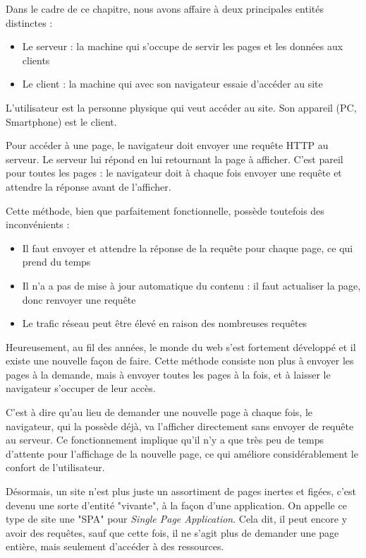 \documentclass[
    iai, %
    eai, %
]{heig-tb}
\begin{document}
Dans le cadre de ce chapitre, nous avons affaire à deux principales entités distinctes :
\begin{itemize}
  \item Le serveur : la machine qui s'occupe de servir les pages et les données aux clients
  \item Le client : la machine qui avec son navigateur essaie d'accéder au site
\end{itemize}
\bigskip
L'utilisateur est la personne physique qui veut accéder au site. Son appareil (PC, Smartphone) est le client.

Pour accéder à une page, le navigateur doit envoyer une requête HTTP au serveur. Le serveur lui répond en lui retournant la page à afficher.
C'est pareil pour toutes les pages : le navigateur doit à chaque fois envoyer une requête et attendre la réponse avant de l'afficher.


Cette méthode, bien que parfaitement fonctionnelle, possède toutefois des inconvénients :
\begin{itemize}
  \item Il faut envoyer et attendre la réponse de la requête pour chaque page, ce qui prend du temps
  \item Il n'a a pas de mise à jour automatique du contenu : il faut actualiser la page, donc renvoyer une requête
  \item Le trafic réseau peut être élevé en raison des nombreuses requêtes
\end{itemize}
\bigskip
Heureusement, au fil des années, le monde du web s'est fortement développé et il existe une nouvelle façon de faire.
Cette méthode consiste non plus à envoyer les pages à la demande, mais à envoyer toutes les pages à la fois, et à laisser le navigateur s'occuper de leur accès.

C'est à dire qu'au lieu de demander une nouvelle page à chaque fois, le navigateur, qui la possède déjà, va l'afficher directement sans envoyer de requête au serveur.
Ce fonctionnement implique qu'il n'y a que très peu de temps d'attente pour l'affichage de la nouvelle page, ce qui améliore considérablement le confort de l'utilisateur.


Désormais, un site n'est plus juste un assortiment de pages inertes et figées, c'est devenu une sorte d'entité "vivante", à la façon d'une application.
On appelle ce type de site une "SPA" pour \emph{Single Page Application}.
Cela dit, il peut encore y avoir des requêtes, sauf que cette fois, il ne s'agit plus de demander une page entière, mais seulement d'accéder à des ressources.
\end{document}

